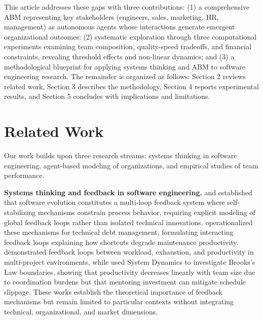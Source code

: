 \documentclass[alpha-refs]{wiley-article}
\begin{document}
This article addresses these gaps with three contributions: (1) a comprehensive ABM representing key stakeholders (engineers, sales, marketing, HR, management) as autonomous agents whose interactions generate emergent organizational outcomes; (2) systematic exploration through three computational experiments examining team composition, quality-speed tradeoffs, and financial constraints, revealing threshold effects and non-linear dynamics; and (3) a methodological blueprint for applying systems thinking and ABM to software engineering research. The remainder is organized as follows: Section 2 reviews related work, Section 3 describes the methodology, Section 4 reports experimental results, and Section 5 concludes with implications and limitations.

\section{Related Work}

Our work builds upon three research streams: systems thinking in software engineering, agent-based modeling of organizations, and empirical studies of team performance.

\textbf{Systems thinking and feedback in software engineering.} \citet{lehman1996feedback} and \citet{lehman1999impact} established that software evolution constitutes a multi-loop feedback system where self-stabilizing mechanisms constrain process behavior, requiring explicit modeling of global feedback loops rather than isolated technical innovations. \citet{franco2023systems} operationalized these mechanisms for technical debt management, formulating interacting feedback loops explaining how shortcuts degrade maintenance productivity. \citet{lee2004multi} demonstrated feedback loops between workload, exhaustion, and productivity in multi-project environments, while \citet{chernoguz2011system} used System Dynamics to investigate Brooks's Law boundaries, showing that productivity decreases linearly with team size due to coordination burdens but that mentoring investment can mitigate schedule slippage. These works establish the theoretical importance of feedback mechanisms but remain limited to particular contexts without integrating technical, organizational, and market dimensions.
\end{document}
